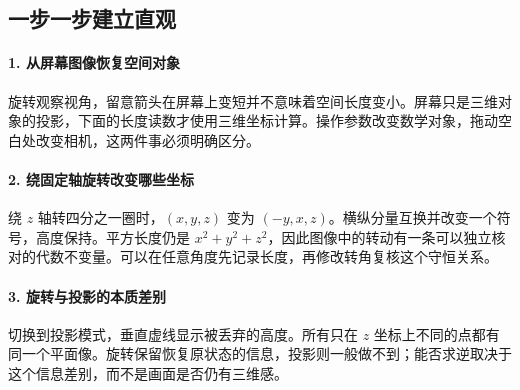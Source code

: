 \subsection*{一步一步建立直观}

\paragraph{1. 从屏幕图像恢复空间对象}

旋转观察视角，留意箭头在屏幕上变短并不意味着空间长度变小。屏幕只是三维对象的投影，下面的长度读数才使用三维坐标计算。操作参数改变数学对象，拖动空白处改变相机，这两件事必须明确区分。



\paragraph{2. 绕固定轴旋转改变哪些坐标}

绕 $z$ 轴转四分之一圈时，$(x,y,z)$ 变为 $(-y,x,z)$。横纵分量互换并改变一个符号，高度保持。平方长度仍是 $x^2+y^2+z^2$，因此图像中的转动有一条可以独立核对的代数不变量。可以在任意角度先记录长度，再修改转角复核这个守恒关系。



\paragraph{3. 旋转与投影的本质差别}

切换到投影模式，垂直虚线显示被丢弃的高度。所有只在 $z$ 坐标上不同的点都有同一个平面像。旋转保留恢复原状态的信息，投影则一般做不到；能否求逆取决于这个信息差别，而不是画面是否仍有三维感。
